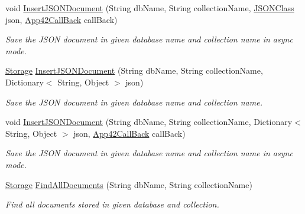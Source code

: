 \begin{DoxyCompactItemize}
void \hyperlink{classcom_1_1shephertz_1_1app42_1_1paas_1_1sdk_1_1csharp_1_1storage_1_1_storage_service_a6948dbdd74ad43db61b4e98ea6818271}{Insert\+J\+S\+O\+N\+Document} (String db\+Name, String collection\+Name, \hyperlink{class_simple_j_s_o_n_1_1_j_s_o_n_class}{J\+S\+O\+N\+Class} json, \hyperlink{interfacecom_1_1shephertz_1_1app42_1_1paas_1_1sdk_1_1csharp_1_1_app42_call_back}{App42\+Call\+Back} call\+Back)
\begin{DoxyCompactList}\small\item\em Save the J\+S\+O\+N document in given database name and collection name in async mode. \end{DoxyCompactList}\item 
\hyperlink{classcom_1_1shephertz_1_1app42_1_1paas_1_1sdk_1_1csharp_1_1storage_1_1_storage}{Storage} \hyperlink{classcom_1_1shephertz_1_1app42_1_1paas_1_1sdk_1_1csharp_1_1storage_1_1_storage_service_afb3cf089b2a73b72600764ce388d7a2f}{Insert\+J\+S\+O\+N\+Document} (String db\+Name, String collection\+Name, Dictionary$<$ String, Object $>$ json)
\begin{DoxyCompactList}\small\item\em Save the J\+S\+O\+N document in given database name and collection name. \end{DoxyCompactList}\item 
void \hyperlink{classcom_1_1shephertz_1_1app42_1_1paas_1_1sdk_1_1csharp_1_1storage_1_1_storage_service_a6b3f35512c147aace710a652b5dcda36}{Insert\+J\+S\+O\+N\+Document} (String db\+Name, String collection\+Name, Dictionary$<$ String, Object $>$ json, \hyperlink{interfacecom_1_1shephertz_1_1app42_1_1paas_1_1sdk_1_1csharp_1_1_app42_call_back}{App42\+Call\+Back} call\+Back)
\begin{DoxyCompactList}\small\item\em Save the J\+S\+O\+N document in given database name and collection name in async mode. \end{DoxyCompactList}\item 
\hyperlink{classcom_1_1shephertz_1_1app42_1_1paas_1_1sdk_1_1csharp_1_1storage_1_1_storage}{Storage} \hyperlink{classcom_1_1shephertz_1_1app42_1_1paas_1_1sdk_1_1csharp_1_1storage_1_1_storage_service_a24b174b1de5b2c8501b237bcca931272}{Find\+All\+Documents} (String db\+Name, String collection\+Name)
\begin{DoxyCompactList}\small\item\em Find all documents stored in given database and collection. \end{DoxyCompactList}\item 

\end{DoxyCompactItemize}
